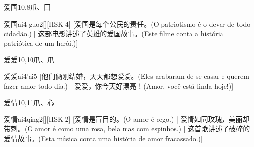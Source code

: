 \begin{entry}{爱国}{10,8}{⽖、⼞}
  \begin{phonetics}{爱国}{ai4 guo2}[][HSK 4]
    [爱国是每个公民的责任。(O patriotismo é o dever de todo cidadão.) | 这部电影讲述了英雄的爱国故事。(Este filme conta a história patriótica de um herói.)]
  \end{phonetics}
\end{entry}

\begin{entry}{爱爱}{10,10}{⽖、⽖}
  \begin{phonetics}{爱爱}{ai4'ai5}
    [他们俩刚结婚，天天都想爱爱。(Eles acabaram de se casar e querem fazer amor todo dia.) | 爱爱，你今天好漂亮！(Amor, você está linda hoje!)]
  \end{phonetics}
\end{entry}

\begin{entry}{爱情}{10,11}{⽖、⼼}
  \begin{phonetics}{爱情}{ai4qing2}[][HSK 2]
    [爱情是盲目的。(O amor é cego.) | 爱情如同玫瑰，美丽却带刺。(O amor é como uma rosa, bela mas com espinhos.)  | 这首歌讲述了破碎的爱情故事。(Esta música conta uma história de amor fracassado.)]
  \end{phonetics}
\end{entry}


